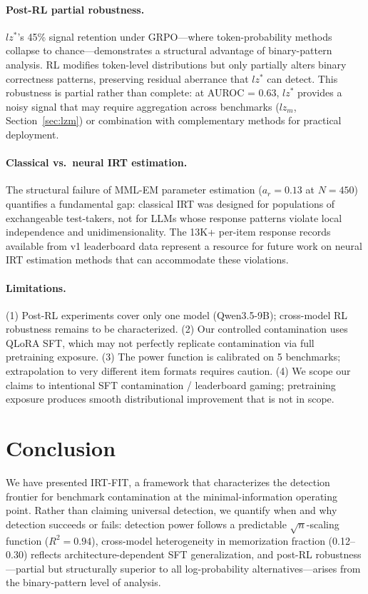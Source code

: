 \documentclass[11pt]{article}
\begin{document}
\paragraph{Post-RL partial robustness.}
$lz^*$'s 45\% signal retention under GRPO---where token-probability methods collapse to chance---demonstrates a structural advantage of binary-pattern analysis.
RL modifies token-level distributions but only partially alters binary correctness patterns, preserving residual aberrance that $lz^*$ can detect.
This robustness is partial rather than complete: at AUROC = 0.63, $lz^*$ provides a noisy signal that may require aggregation across benchmarks ($lz_m$, Section~\ref{sec:lzm}) or combination with complementary methods for practical deployment.

\paragraph{Classical vs.\ neural IRT estimation.}
The structural failure of MML-EM parameter estimation ($a_r = 0.13$ at $N = 450$) quantifies a fundamental gap: classical IRT was designed for populations of exchangeable test-takers, not for LLMs whose response patterns violate local independence and unidimensionality.
The 13K+ per-item response records available from v1 leaderboard data represent a resource for future work on neural IRT estimation methods that can accommodate these violations.

\paragraph{Limitations.}
(1) Post-RL experiments cover only one model (Qwen3.5-9B); cross-model RL robustness remains to be characterized.
(2) Our controlled contamination uses QLoRA SFT, which may not perfectly replicate contamination via full pretraining exposure.
(3) The power function is calibrated on 5 benchmarks; extrapolation to very different item formats requires caution.
(4) We scope our claims to intentional SFT contamination / leaderboard gaming; pretraining exposure produces smooth distributional improvement that is not in scope.

\section{Conclusion}
\label{sec:conclusion}

We have presented IRT-FIT, a framework that characterizes the detection frontier for benchmark contamination at the minimal-information operating point.
Rather than claiming universal detection, we quantify when and why detection succeeds or fails: detection power follows a predictable $\sqrt{n}$-scaling function ($R^2 = 0.94$), cross-model heterogeneity in memorization fraction (0.12--0.30) reflects architecture-dependent SFT generalization, and post-RL robustness---partial but structurally superior to all log-probability alternatives---arises from the binary-pattern level of analysis.
\end{document}
